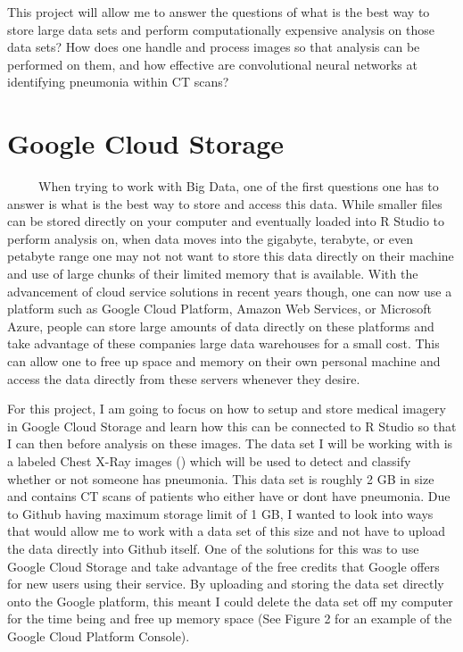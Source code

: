 \documentclass[12pt]{article}
\begin{document}
This project will allow me to answer the questions of what is the best
way to store large data sets and perform computationally expensive
analysis on those data sets? How does one handle and process images so
that analysis can be performed on them, and how effective are
convolutional neural networks at identifying pneumonia within CT scans?

\hypertarget{google-cloud-storage}{%
\section{Google Cloud Storage}\label{google-cloud-storage}}

~~~~~When trying to work with Big Data, one of the first questions one
has to answer is what is the best way to store and access this data.
While smaller files can be stored directly on your computer and
eventually loaded into R Studio to perform analysis on, when data moves
into the gigabyte, terabyte, or even petabyte range one may not not want
to store this data directly on their machine and use of large chunks of
their limited memory that is available. With the advancement of cloud
service solutions in recent years though, one can now use a platform
such as Google Cloud Platform, Amazon Web Services, or Microsoft Azure,
people can store large amounts of data directly on these platforms and
take advantage of these companies large data warehouses for a small
cost. This can allow one to free up space and memory on their own
personal machine and access the data directly from these servers
whenever they desire.

For this project, I am going to focus on how to setup and store medical
imagery in Google Cloud Storage and learn how this can be connected to R
Studio so that I can then before analysis on these images. The data set
I will be working with is a labeled Chest X-Ray images (\citet{Medical})
which will be used to detect and classify whether or not someone has
pneumonia. This data set is roughly 2 GB in size and contains CT scans
of patients who either have or dont have pneumonia. Due to Github having
maximum storage limit of 1 GB, I wanted to look into ways that would
allow me to work with a data set of this size and not have to upload the
data directly into Github itself. One of the solutions for this was to
use Google Cloud Storage and take advantage of the free credits that
Google offers for new users using their service. By uploading and
storing the data set directly onto the Google platform, this meant I
could delete the data set off my computer for the time being and free up
memory space (See Figure 2 for an example of the Google Cloud Platform
Console).
\end{document}
